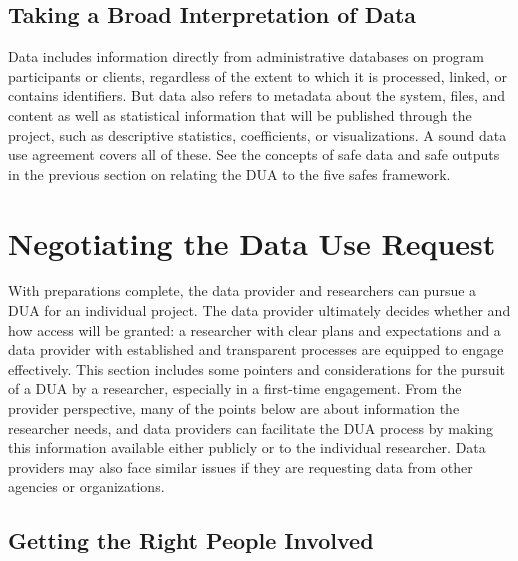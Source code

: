 \documentclass[
]{book}
\begin{document}
\hypertarget{taking-a-broad-interpretation-of-data}{%
\subsection{Taking a Broad Interpretation of Data}\label{taking-a-broad-interpretation-of-data}}

Data includes information directly from administrative databases on program participants or clients, regardless of the extent to which it is processed, linked, or contains identifiers. But data also refers to metadata about the system, files, and content as well as statistical information that will be published through the project, such as descriptive statistics, coefficients, or visualizations. A sound data use agreement covers all of these. See the concepts of safe data and safe outputs in the previous section on relating the DUA to the five safes framework.

\hypertarget{negotiating-the-data-use-request}{%
\section{Negotiating the Data Use Request}\label{negotiating-the-data-use-request}}

With preparations complete, the data provider and researchers can pursue a DUA for an individual project. The data provider ultimately decides whether and how access will be granted: a researcher with clear plans and expectations and a data provider with established and transparent processes are equipped to engage effectively. This section includes some pointers and considerations for the pursuit of a DUA by a researcher, especially in a first-time engagement. From the provider perspective, many of the points below are about information the researcher needs, and data providers can facilitate the DUA process by making this information available either publicly or to the individual researcher. Data providers may also face similar issues if they are requesting data from other agencies or organizations.

\hypertarget{getting-the-right-people-involved}{%
\subsection{Getting the Right People Involved}\label{getting-the-right-people-involved}}
\end{document}
